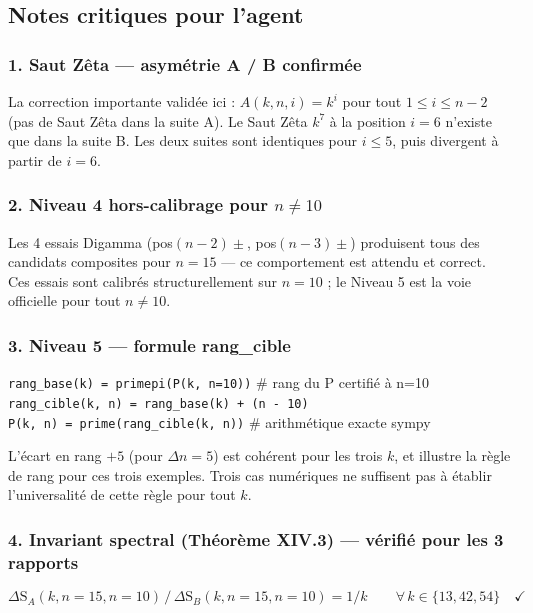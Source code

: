 \documentclass[11pt,a4paper]{article}
\newcommand{\SA}{\mathrm{S}_A}
\newcommand{\SB}{\mathrm{S}_B}
\begin{document}
\subsection{Notes critiques pour l'agent}

\subsubsection{1. Saut Zêta --- asymétrie A / B confirmée}
La correction importante validée ici : $A(k,n,i) = k^{i}$ pour tout
$1 \le i \le n-2$ (pas de Saut Zêta dans la suite A). Le Saut Zêta $k^{7}$ à la
position $i=6$ n'existe que dans la suite B. Les deux suites sont identiques
pour $i \le 5$, puis divergent à partir de $i = 6$.

\subsubsection{2. Niveau 4 hors-calibrage pour $n \neq 10$}
Les 4 essais Digamma (pos$(n-2)\pm$, pos$(n-3)\pm$) produisent tous des
candidats composites pour $n=15$ --- ce comportement est attendu et correct.
Ces essais sont calibrés structurellement sur $n=10$ ; le Niveau 5 est la voie
officielle pour tout $n \neq 10$.

\subsubsection{3. Niveau 5 --- formule rang\_cible}
\begin{boiteformule}
\texttt{rang\_base(k) = primepi(P(k, n=10))} \quad \# rang du P certifié à n=10\\
\texttt{rang\_cible(k, n) = rang\_base(k) + (n - 10)}\\
\texttt{P(k, n) = prime(rang\_cible(k, n))} \quad \# arithmétique exacte sympy
\end{boiteformule}
L'écart en rang $+5$ (pour $\Delta n = 5$) est cohérent pour les trois $k$,
et illustre la règle de rang pour ces trois exemples. Trois cas numériques ne
suffisent pas à établir l'universalité de cette règle pour tout $k$.

\subsubsection{4. Invariant spectral (Théorème XIV.3) --- vérifié pour les 3 rapports}
\[
\Delta\SA(k, n{=}15, n{=}10)\,/\,\Delta\SB(k, n{=}15, n{=}10) = 1/k
\qquad \forall\, k \in \{13, 42, 54\} \quad \checkmark
\]
\end{document}
